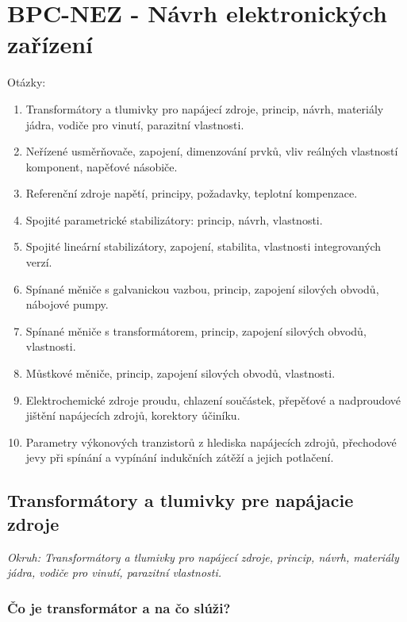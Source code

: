 \graphicspath{{Obrazky/Obrazky_NEZ/}}
\part{BPC-NEZ - Návrh elektronických zařízení}
\begin{huge}
	Otázky:
	\newline
\end{huge}
\begin{enumerate}
	\item Transformátory a tlumivky pro napájecí zdroje, princip, návrh, materiály jádra, vodiče pro vinutí, parazitní vlastnosti.
	\item Neřízené usměrňovače, zapojení, dimenzování prvků, vliv reálných vlastností komponent, napěťové násobiče.
	\item Referenční zdroje napětí, principy, požadavky, teplotní kompenzace.
	\item Spojité parametrické stabilizátory: princip, návrh, vlastnosti.
	\item Spojité lineární stabilizátory, zapojení, stabilita, vlastnosti integrovaných verzí.
	\item Spínané měniče s galvanickou vazbou, princip, zapojení silových obvodů, nábojové pumpy.
	\item Spínané měniče s transformátorem, princip, zapojení silových obvodů, vlastnosti.
	\item Můstkové měniče, princip, zapojení silových obvodů, vlastnosti.
	\item Elektrochemické zdroje proudu, chlazení součástek, přepěťové a nadproudové jištění napájecích zdrojů, korektory účiníku.
	\item Parametry výkonových tranzistorů z hlediska napájecích zdrojů, přechodové jevy při spínání a vypínání indukčních zátěží a jejich potlačení.
\end{enumerate}
\chapter{Transformátory a tlumivky pre napájacie zdroje}

\textit{Okruh: Transformátory a tlumivky pro napájecí zdroje, princip, návrh, materiály jádra, vodiče pro vinutí, parazitní vlastnosti.}

\section{Čo je transformátor a na čo slúži?}

